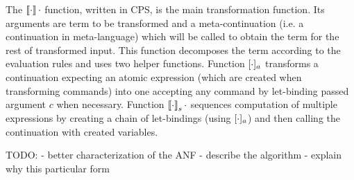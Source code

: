 The $\left\llbracket \cdot \right\rrbracket\cdot$ function, written in CPS, is the main transformation function.
Its arguments are term to be transformed and a meta-continuation (i.e. a continuation in meta-language) which will be called to obtain the term for the rest of transformed input.
This function decomposes the term according to the evaluation rules and uses two helper functions.
Function $[ \cdot ]_{a}$ transforms a continuation expecting an atomic expression (which are created when transforming commands) into one accepting any command by let-binding passed argument $c$ when necessary.
Function $\left\llbracket \cdot \right\rrbracket_{s} \cdot$ sequences computation of multiple expressions by creating a chain of let-bindings (using $[ \cdot ]_{a}$) and then calling the continuation with created variables.

TODO:
- better characterization of the ANF
- describe the algorithm
- explain why this particular form

